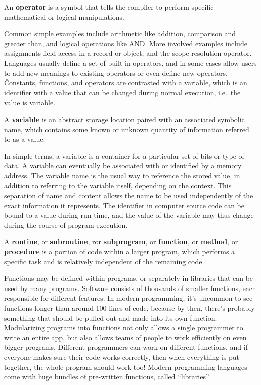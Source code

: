 \bd[Operator]
An \textbf{operator} is a symbol that tells the compiler to perform specific mathematical or logical manipulations.
\ed

Common simple examples include arithmetic like addition, comparison and greater than, and logical operations like AND\@.
More involved examples include assignments field access in a record or object, and the scope resolution operator.
Languages usually define a set of built-in operators, and in some cases allow users to add new meanings to existing
operators or even define new operators. \v

Constants, functions, and operators are contrasted with a variable, which is an identifier with a value that can be
changed during normal execution, i.e.\ the value is variable.

\bd[Variable]
A \textbf{variable} is an abstract storage location paired with an associated symbolic name, which contains some
known or unknown quantity of information referred to as a value.
\ed

In simple terms, a variable is a container for a particular set of bits or type of data. A variable can eventually be
associated with or identified by a memory address. The variable name is the usual way to reference the stored value,
in addition to referring to the variable itself, depending on the context. This separation of name and content allows
the name to be used independently of the exact information it represents. The identifier in computer source code can
be bound to a value during run time, and the value of the variable may thus change during the course of program
execution.

A \textbf{routine}, or \textbf{subroutine}, ror \textbf{subprogram}, or \textbf{function}, or \textbf{method}, or
\textbf{procedure} is a portion of code within a larger program, which performs a specific task and is relatively
independent of the remaining code.
\ed

Functions may be defined within programs, or separately in libraries that can be used by many programs. Software
consists of thousands of smaller functions, each responsible for different features. In modern programming, it's
uncommon to see functions longer than around 100 lines of code, because by then, there's probably something that
should be pulled out and made into its own function. Modularizing programs into functions not only allows a
single programmer to write an entire app, but also allows teams of people to work efficiently on even bigger programs.
Different programmers can work on different functions, and if everyone makes sure their code works correctly,
then when everything is put together, the whole program should work too! Modern programming languages come with huge
bundles of pre-written functions, called ``libraries''.

